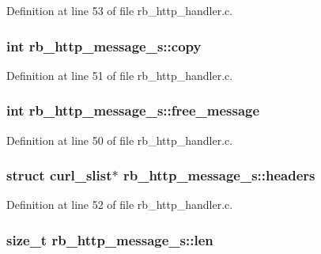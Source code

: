 Definition at line 53 of file rb\-\_\-http\-\_\-handler.\-c.

\hypertarget{structrb__http__message__s_aceda798a9af4f28a6dc89b273e6c348a}{
\subsubsection[{copy}]{\setlength{\rightskip}{0pt plus 5cm}int rb\-\_\-http\-\_\-message\-\_\-s\-::copy}}\label{structrb__http__message__s_aceda798a9af4f28a6dc89b273e6c348a}


Definition at line 51 of file rb\-\_\-http\-\_\-handler.\-c.

\hypertarget{structrb__http__message__s_acbfdd79b7ec041a7b7e0edac1da72d30}{
\subsubsection[{free\-\_\-message}]{\setlength{\rightskip}{0pt plus 5cm}int rb\-\_\-http\-\_\-message\-\_\-s\-::free\-\_\-message}}\label{structrb__http__message__s_acbfdd79b7ec041a7b7e0edac1da72d30}


Definition at line 50 of file rb\-\_\-http\-\_\-handler.\-c.

\hypertarget{structrb__http__message__s_ae12176a1bd60ed536eda95e2c530acc4}{
\subsubsection[{headers}]{\setlength{\rightskip}{0pt plus 5cm}struct curl\-\_\-slist$\ast$ rb\-\_\-http\-\_\-message\-\_\-s\-::headers}}\label{structrb__http__message__s_ae12176a1bd60ed536eda95e2c530acc4}


Definition at line 52 of file rb\-\_\-http\-\_\-handler.\-c.

\hypertarget{structrb__http__message__s_a8c352ee939f1cd197bf009583e61552f}{
\subsubsection[{len}]{\setlength{\rightskip}{0pt plus 5cm}size\-\_\-t rb\-\_\-http\-\_\-message\-\_\-s\-::len}}\label{structrb__http__message__s_a8c352ee939f1cd197bf009583e61552f}


